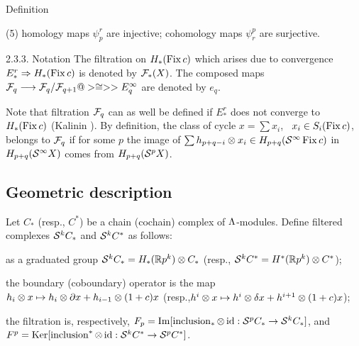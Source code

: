 \documentclass{article}
\begin{document}
\begin{subsubsection}{ Definition}
\begin{proclaim}
{(5) homology maps $\psi_p^r$ are injective;
cohomology maps $\psi_r^p$ are surjective.
}\end{proclaim}
\begin{definition}{{2.3.3. Notation} The filtration on $H_*(\operatorname{Fix} c)$ which
arises due to convergence $E_*^r\Rightarrow H_*(\operatorname{Fix} c)$ is denoted by
$\mathcal F_*(X)$. The composed maps
$\mathcal F_q\longrightarrow\mathcal F_q/\mathcal F_{q+1}@>\cong>> E_q^\infty$ are denoted by $e_q$.

Note that filtration $\mathcal F_q$ can as well be defined if $E_*^r$ does
not converge to $H_*(\operatorname{Fix} c)$ (Kalinin \cite{5}). By definition,
the class of cycle $x=\sum x_i$, \ $x_i\in S_i(\operatorname{Fix} c)$, belongs to
$\mathcal F_q$ if for some $p$ the image of
$\sum h_{p+q-i}\otimes x_i\in H_{p+q}(\mathcal S^\infty\operatorname{Fix} c)$  in
$H_{p+q}(\mathcal S^\infty X)$ comes from $H_{p+q}(\mathcal S^pX)$.
}\end{definition}
\subsection{Geometric description }
Let $C_*$ (resp., $C^*$) be a chain (cochain) complex of
$\Lambda$-modules. Define filtered complexes $\mathcal S^kC_*$ and $\mathcal S^kC^*$
as follows:

as a graduated group $\mathcal S^kC_*=H_*(\mathbb R p^k)\otimes C_*$
(resp., $\mathcal S^kC^*=H^*(\mathbb R p^k)\otimes C^*$);

the boundary (coboundary) operator is the map
$h_i\otimes x\mapsto h_i\otimes\partial x+h_{i-1}\otimes(1+c)x$
(resp.,\linebreak $h^i\otimes x\mapsto h^i\otimes\delta x+h^{i+1}\otimes(1+c)x$);

the filtration is, respectively,
$F_p=\operatorname{Im}[\operatorname{inclusion}_*\otimes\operatorname{id}:\mathcal S^pC_*\to \mathcal S^kC_*]$, and
$F^p=\operatorname{Ker}[\operatorname{inclusion}^*\otimes\operatorname{id}:\mathcal S^kC^*\to \mathcal S^pC^*]$.


\end{subsubsection}
\end{document}
